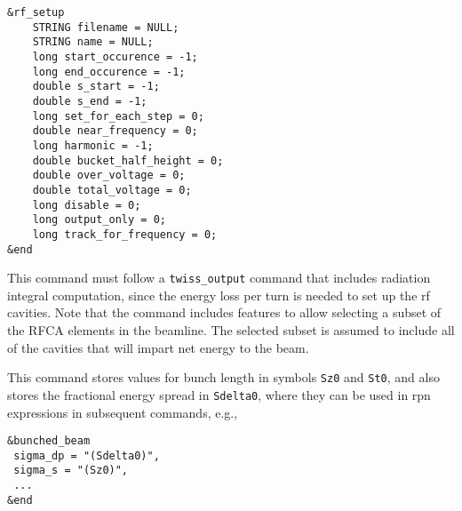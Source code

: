 \documentclass[11pt]{article}
\begin{document}
\begin{verbatim}
&rf_setup
    STRING filename = NULL;
    STRING name = NULL;
    long start_occurence = -1;
    long end_occurence = -1;
    double s_start = -1;
    double s_end = -1;
    long set_for_each_step = 0;
    double near_frequency = 0; 
    long harmonic = -1;
    double bucket_half_height = 0;
    double over_voltage = 0;
    double total_voltage = 0;
    long disable = 0;
    long output_only = 0;
    long track_for_frequency = 0;
&end
\end{verbatim}

This command must follow a \verb|twiss_output| command that includes radiation integral computation, since the 
energy loss per turn is needed to set up the rf cavities.
Note that the command includes features to allow selecting a subset of the RFCA elements in the beamline.
The selected subset is assumed to include all of the cavities that will impart net energy to the beam.

This command stores values for bunch length in symbols \verb|Sz0| and \verb|St0|, and also stores the fractional
energy spread in \verb|Sdelta0|, where they can be used in rpn expressions in subsequent  commands, e.g.,
\begin{verbatim}
&bunched_beam
 sigma_dp = "(Sdelta0)",
 sigma_s = "(Sz0)",
 ...
&end
\end{verbatim}
\end{document}
